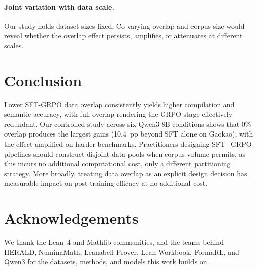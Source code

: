 \documentclass[11pt,a4paper]{article}
\begin{document}
\paragraph{Joint variation with data scale.} Our study holds dataset sizes fixed. Co-varying overlap and corpus size would reveal whether the overlap effect persists, amplifies, or attenuates at different scales.

\section{Conclusion}\label{sec:conclusion}

Lower SFT-GRPO data overlap consistently yields higher compilation and semantic accuracy, with full overlap rendering the GRPO stage effectively redundant. Our controlled study across six Qwen3-8B conditions shows that 0\% overlap produces the largest gains (10.4~pp beyond SFT alone on Gaokao), with the effect amplified on harder benchmarks. Practitioners designing SFT+GRPO pipelines should construct disjoint data pools when corpus volume permits, as this incurs no additional computational cost, only a different partitioning strategy. More broadly, treating data overlap as an explicit design decision has measurable impact on post-training efficacy at no additional cost.

\section*{Acknowledgements}

We thank the Lean~4 and Mathlib communities, and the teams behind HERALD, NuminaMath, Leanabell-Prover, Lean Workbook, FormaRL, and Qwen3 for the datasets, methods, and models this work builds on.


\end{document}
